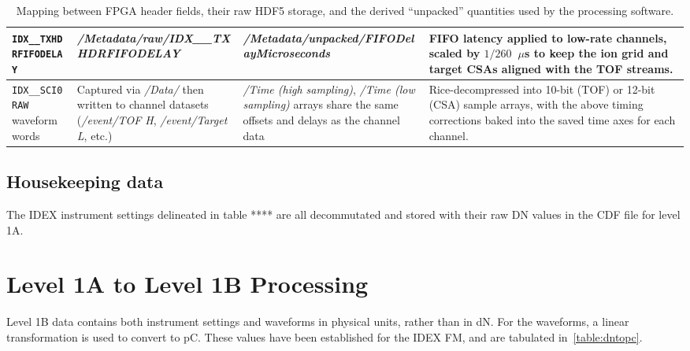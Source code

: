 \begin{landscape}
\begin{table}[H]
\begin{tabularx}{\linewidth}{|>{\raggedright\arraybackslash}p{3.5cm}|>{\raggedright\arraybackslash}p{3.6cm}|>{\raggedright\arraybackslash}X|>{\raggedright\arraybackslash}X|}
 \texttt{IDX\_\_TXHDRFIFODELAY} & \textit{/Metadata/raw/IDX\_\_TXHDRFIFODELAY} & \textit{/Metadata/unpacked/FIFODelayMicroseconds} & FIFO latency applied to low-rate channels, scaled by $1/260$~$\mu$s to keep the ion grid and target CSAs aligned with the TOF streams. \\\hline
 \texttt{IDX\_\_SCI0RAW} waveform words & Captured via \textit{/Data/} then written to channel datasets (\textit{/event/TOF H}, \textit{/event/Target L}, etc.) & \textit{/Time (high sampling)}, \textit{/Time (low sampling)} arrays share the same offsets and delays as the channel data & Rice-decompressed into 10-bit (TOF) or 12-bit (CSA) sample arrays, with the above timing corrections baked into the saved time axes for each channel. \\\hline
\end{tabularx}
\caption{Mapping between FPGA header fields, their raw HDF5 storage, and the derived “unpacked” quantities used by the processing software.}
\label{tab:fpga_to_packet}
\end{table}
\end{landscape}


\subsection{Housekeeping data}
The IDEX instrument settings delineated in table **** are all decommutated and stored with their raw DN values in the CDF file for level 1A.

\section{Level 1A to Level 1B Processing}
Level 1B data contains both instrument settings and waveforms in physical units, rather than in dN. For the waveforms, a linear transformation is used to convert to pC. These values have been established for the IDEX FM, and are tabulated in~\ref{table:dntopc}.


